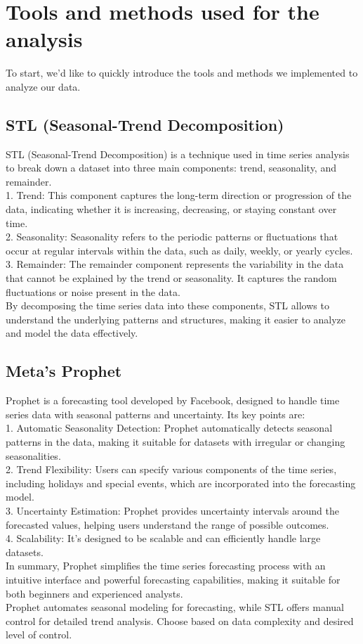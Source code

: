 \section{Tools and methods used for the analysis}
\noindent
To start, we'd like to quickly introduce the tools and methods we implemented to analyze our data.

\vspace{-15pt}

\subsection{STL (Seasonal-Trend Decomposition)}
STL (Seasonal-Trend Decomposition) is a technique used in time series analysis to break down a dataset into three main components: trend, seasonality, and remainder. \\
1. Trend: This component captures the long-term direction or progression of the data, indicating whether it is increasing, decreasing, or staying constant over time. \\
2. Seasonality: Seasonality refers to the periodic patterns or fluctuations that occur at regular intervals within the data, such as daily, weekly, or yearly cycles. \\
3. Remainder: The remainder component represents the variability in the data that cannot be explained by the trend or seasonality. It captures the random fluctuations or noise present in the data. \\
By decomposing the time series data into these components, STL allows to understand the underlying patterns and structures, making it easier to analyze and model the data effectively.

\vspace{-15pt}

\subsection{Meta's Prophet}
Prophet is a forecasting tool developed by Facebook, designed to handle time series data with seasonal patterns and uncertainty. Its key points are: \\
1. Automatic Seasonality Detection: Prophet automatically detects seasonal patterns in the data, making it suitable for datasets with irregular or changing seasonalities. \\
2. Trend Flexibility: Users can specify various components of the time series, including holidays and special events, which are incorporated into the forecasting model. \\
3. Uncertainty Estimation: Prophet provides uncertainty intervals around the forecasted values, helping users understand the range of possible outcomes. \\
4. Scalability: It's designed to be scalable and can efficiently handle large datasets. \\
In summary, Prophet simplifies the time series forecasting process with an intuitive interface and powerful forecasting capabilities, making it suitable for both beginners and experienced analysts. \\

Prophet automates seasonal modeling for forecasting, while STL offers manual control for detailed trend analysis. Choose based on data complexity and desired level of control.

